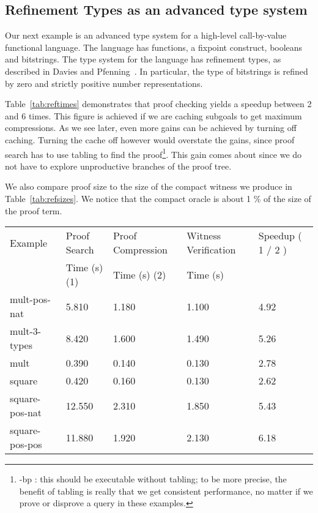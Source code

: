 \documentclass{llncs}
\begin{document}
\subsection{Refinement Types as an advanced type system}
Our next example is an advanced type system for a high-level
call-by-value functional language. The language has functions, a
fixpoint construct, booleans and bitstrings. The type system for the
language has refinement types, as described in Davies and
Pfenning~\cite{davies+:intersection}. In particular, the type of
bitstrings is refined by zero and strictly positive number
representations.

Table~\ref{tab:reftimes} demonstrates that proof checking yields a
speedup between 2 and 6 times. This figure is achieved if we are caching
subgoals to get maximum compressions. As we see later, even more gains
can be achieved by turning off caching. Turning the cache off however
would overstate the gains, since proof search has to use tabling to
find the proof\footnote{-bp : this should be executable without
  tabling; to be more precise, the benefit of tabling is really that
  we get consistent performance, no matter if we prove or disprove a
  query in these examples.}. This gain comes about since we do not
have to explore  unproductive branches of the proof tree.

We also compare proof size to the size of the compact witness we
produce in Table~\ref{tab:refsizes}. We notice that the compact oracle
is about 1 \% of the size of the proof term.

\begin{table*}[htbp]
\begin{center}
\begin{small}
\begin{tabular}{|l|l|l|l|l|}
\hline
Example & Proof Search & Proof Compression 
& Witness Verification & Speedup ( 1 / 2 )\\
& Time (s) (1) & Time (s) (2) & Time (s) & \\
\hline
mult-pos-nat & 5.810 & 1.180 & 1.100 & 4.92 \\
mult-3-types & 8.420 & 1.600 & 1.490 & 5.26 \\
mult & 0.390 & 0.140 & 0.130 & 2.78 \\
square & 0.420 & 0.160 & 0.130 & 2.62 \\
square-pos-nat & 12.550 & 2.310 & 1.850 & 5.43 \\
square-pos-pos & 11.880 & 1.920 & 2.130 & 6.18 \\
\hline
\end{tabular}
\end{small}
\end{center}
\caption{\label{tab:reftimes} Refinement Type System : 
Proof Compression Times with Caching}
\end{table*}
\end{document}
